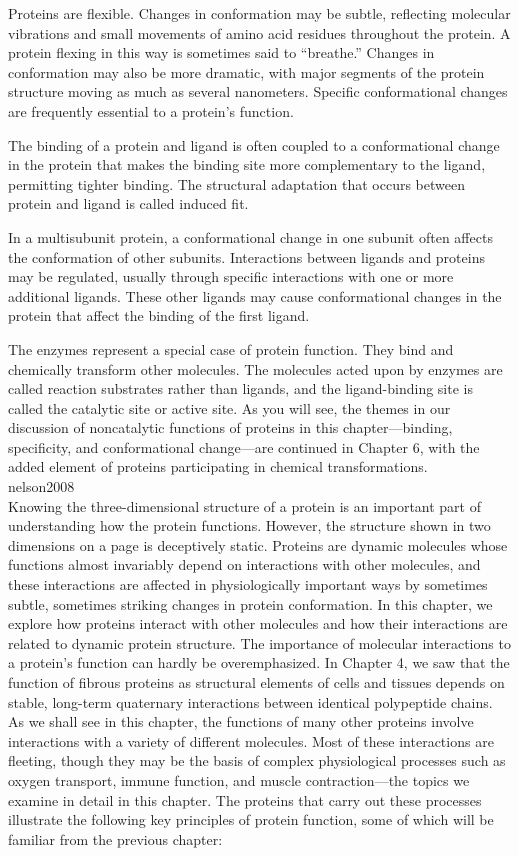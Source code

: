 Proteins are flexible. Changes in conformation may be subtle, reflecting molecular vibrations and small movements of amino acid residues throughout the protein. A protein flexing in this way is sometimes said to ``breathe.'' Changes in conformation may also be more dramatic, with major segments of the protein structure moving as much as several nanometers. Specific conformational changes are frequently essential to a protein’s function. 

The binding of a protein and ligand is often coupled to a conformational change in the protein that makes the binding site more complementary to the ligand, permitting tighter binding. The structural adaptation that occurs between protein and ligand is called induced fit.

In a multisubunit protein, a conformational change in one subunit often affects the conformation of other subunits. Interactions between ligands and proteins may be regulated, usually through specific interactions with one or more additional ligands. These other ligands may cause conformational changes in the protein that affect the binding of the first ligand. 

The enzymes represent a special case of protein function. They bind and chemically transform other molecules. The molecules acted upon by enzymes are called reaction substrates rather than ligands, and the ligand-binding site is called the catalytic site or active site. As you will see, the themes in our discussion of noncatalytic functions of proteins in this chapter—binding, specificity, and conformational change—are continued in Chapter 6, with the added element of proteins participating in chemical transformations.
\\
nelson2008\\
Knowing the three-dimensional structure of a protein is an important part of understanding how the protein functions. However, the structure shown in two dimensions on a page is deceptively static. Proteins are dynamic molecules whose functions almost invariably depend on interactions with other molecules, and these interactions are affected in physiologically important ways by sometimes subtle, sometimes striking changes in protein conformation. In this chapter, we explore how proteins interact with other molecules and how their interactions are related to dynamic protein structure. The importance of molecular interactions to a protein’s function can hardly be overemphasized. In Chapter 4, we saw that the function of fibrous proteins as structural elements of cells and tissues depends on stable, long-term quaternary interactions between identical polypeptide chains. As we shall see in this chapter, the functions of many other proteins involve interactions with a variety of different molecules. Most of these interactions are fleeting, though they may be the basis of complex physiological processes such as oxygen transport, immune function, and muscle contraction—the topics we examine in detail in this chapter. The proteins that carry out these processes illustrate the following key principles of protein function, some of which will be familiar from the previous chapter:

